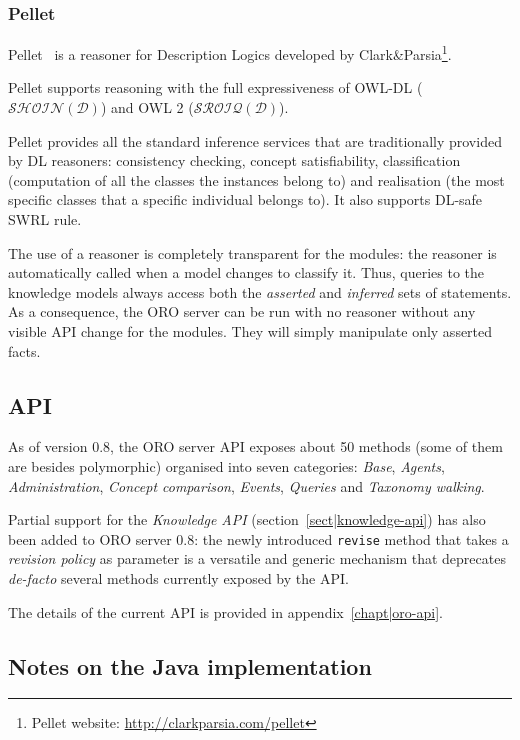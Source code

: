 \subsubsection{Pellet}
\label{sect|pellet}

{\sc Pellet}~\cite{Sirin2007} is a reasoner for Description Logics developed by
Clark\&Parsia\footnote{{\sc Pellet} website:
\url{http://clarkparsia.com/pellet}}.

Pellet supports reasoning with the full expressiveness of OWL-DL
($\mathcal{SHOIN(D)}$) and OWL 2 ($\mathcal{SROIQ(D)}$).

Pellet provides all the standard inference services that are traditionally
provided by DL reasoners: consistency checking, concept satisfiability,
classification (computation of all the classes the instances belong to) and
realisation (the most specific classes that a specific individual belongs to).
It also supports DL-safe SWRL rule.

The use of a reasoner is completely transparent for the modules: the reasoner
is automatically called when a model changes to classify it. Thus, queries
to the knowledge models always access both the \emph{asserted} and
\emph{inferred} sets of statements. As a consequence, the ORO server can be run
with no reasoner without any visible API change for the modules. They will
simply manipulate only asserted facts.

\subsection{API}

As of version 0.8, the ORO server API exposes about 50 methods (some of them
are besides polymorphic) organised into seven categories: \emph{Base},
\emph{Agents}, \emph{Administration}, \emph{Concept comparison}, \emph{Events},
\emph{Queries} and \emph{Taxonomy walking}.

Partial support for the \emph{Knowledge API} (section~\ref{sect|knowledge-api})
has also been added to ORO server 0.8: the newly introduced {\tt revise} method
that takes a \emph{revision policy} as parameter is a versatile and generic
mechanism that deprecates {\it de-facto} several methods currently exposed by
the API.

The details of the current API is provided in appendix~\ref{chapt|oro-api}.

\subsection{Notes on the Java implementation}
\label{sect|java-impl}

